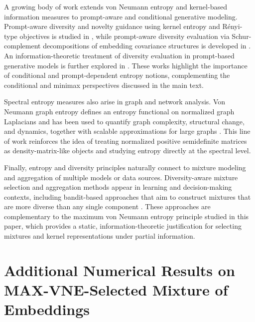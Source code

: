 \documentclass{article}
\theoremstyle{plain}
\theoremstyle{definition}
\begin{document}
\begin{appendices}
A growing body of work extends von Neumann entropy and kernel-based information measures to prompt-aware and conditional generative modeling. Prompt-aware diversity and novelty guidance using kernel entropy and R\'enyi-type objectives is studied in \cite{jalalisparke}, while prompt-aware diversity evaluation via Schur-complement decompositions of embedding covariance structures is developed in \cite{ospanov2025scendi}. An information-theoretic treatment of diversity evaluation in prompt-based generative models is further explored in \cite{jalali2025information}. These works highlight the importance of conditional and prompt-dependent entropy notions, complementing the conditional and minimax perspectives discussed in the main text.

Spectral entropy measures also arise in graph and network analysis. Von Neumann graph entropy defines an entropy functional on normalized graph Laplacians and has been used to quantify graph complexity, structural change, and dynamics, together with scalable approximations for large graphs \cite{Chen2018VNGE}. This line of work reinforces the idea of treating normalized positive semidefinite matrices as density-matrix-like objects and studying entropy directly at the spectral level.

Finally, entropy and diversity principles naturally connect to mixture modeling and aggregation of multiple models or data sources. Diversity-aware mixture selection and aggregation methods appear in learning and decision-making contexts, including bandit-based approaches that aim to construct mixtures that are more diverse than any single component \cite{rezaei2024more}. These approaches are complementary to the maximum von Neumann entropy principle studied in this paper, which provides a static, information-theoretic justification for selecting mixtures and kernel representations under partial information.


\section{Additional Numerical Results on MAX-VNE-Selected Mixture of Embeddings}


\end{appendices}
\end{document}
